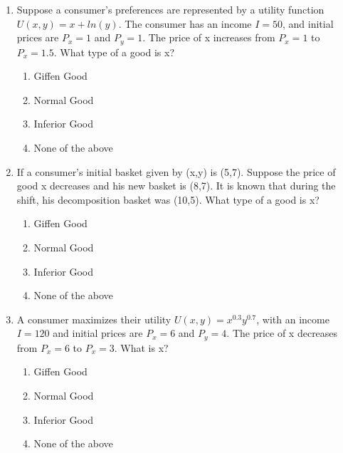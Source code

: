 \documentclass{article}
\begin{document}
\begin{enumerate}
        \begin{itemize}
            \item Price of $X$ = \$2
            \item Price of $Y$ = \$5
            \item Income = \$10
        \end{itemize}
        Graphically interpret and find the equation of the indifference curve with maximum utility.
    \item 
        Suppose a consumer's preferences are represented by a utility function $U(x,y) = x + ln(y)$. The consumer has an income $I=50$, and initial prices are $P_x = 1$ and $P_y = 1$. The price of x increases from $P_x =1$ to $P_x = 1.5$. What type of a good is x?
        \begin{enumerate}[label=(\alph*)] 
            \item Giffen Good
            \item Normal Good
            \item Inferior Good
            \item None of the above
        \end{enumerate}
    \item 
        If a consumer's initial basket given by (x,y) is (5,7). Suppose the price of good x decreases and his new basket is (8,7). It is known that during the shift, his decomposition basket was (10,5). What type of a good is x?
        \begin{enumerate}[label=(\alph*)] 
            \item Giffen Good
            \item Normal Good
            \item Inferior Good
            \item None of the above
        \end{enumerate}
    \item 
        A consumer maximizes their utility $U(x,y) = x^{0.3}y^{0.7}$, with an income $I=120$ and initial prices are $P_x = 6$ and $P_y=4$. The price of x decreases from $P_x = 6$ to $P_x = 3$. What is x?
        \begin{enumerate}[label=(\alph*)] 
            \item Giffen Good
            \item Normal Good
            \item Inferior Good
            \item None of the above
        \end{enumerate}

\end{enumerate}
\end{document}
